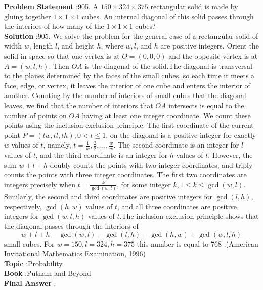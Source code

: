 \documentclass[10pt]{article}
\begin{document}
\textbf{Problem Statement} :905. A $150 \times 324 \times 375$ rectangular solid is made by gluing together $1 \times 1 \times 1$ cubes. An internal diagonal of this solid passes through the interiors of how many of the $1 \times 1 \times 1$ cubes?\\
\textbf{Solution} :905. We solve the problem for the general case of a rectangular solid of width $w$, length $l$, and height $h$, where $w, l$, and $h$ are positive integers. Orient the solid in space so that one vertex is at $O=(0,0,0)$ and the opposite vertex is at $A=(w, l, h)$. Then $O A$ is the diagonal of the solid.The diagonal is transversal to the planes determined by the faces of the small cubes, so each time it meets a face, edge, or vertex, it leaves the interior of one cube and enters the interior of another. Counting by the number of interiors of small cubes that the diagonal leaves, we find that the number of interiors that $O A$ intersects is equal to the number of points on $O A$ having at least one integer coordinate. We count these points using the inclusion-exclusion principle. The first coordinate of the current point $P=(t w, t l, t h), 0<t \leq 1$, on the diagonal is a positive integer for exactly $w$ values of $t$, namely, $t=\frac{1}{w}, \frac{2}{2}, \ldots, \frac{w}{w}$. The second coordinate is an integer for $l$ values of $t$, and the third coordinate is an integer for $h$ values of $t$. However, the sum $w+l+h$ doubly counts the points with two integer coordinates, and triply counts the points with three integer coordinates. The first two coordinates are integers precisely when $t=\frac{k}{\operatorname{gcd}(w, l)}$, for some integer $k, 1 \leq k \leq \operatorname{gcd}(w, l)$. Similarly, the second and third coordinates are positive integers for $\operatorname{gcd}(l, h)$, respectively, $\operatorname{gcd}(h, w)$ values of $t$, and all three coordinates are positive integers for $\operatorname{gcd}(w, l, h)$ values of $t$.The inclusion-exclusion principle shows that the diagonal passes through the interiors of$$ w+l+h-\operatorname{gcd}(w, l)-\operatorname{gcd}(l, h)-\operatorname{gcd}(h, w)+\operatorname{gcd}(w, l, h) $$small cubes. For $w=150, l=324, h=375$ this number is equal to 768 .(American Invitational Mathematics Examination, 1996)\\
\textbf{Topic} :Probability\\
\textbf{Book} :Putnam and Beyond\\
\textbf{Final Answer} :\\
\end{document}
